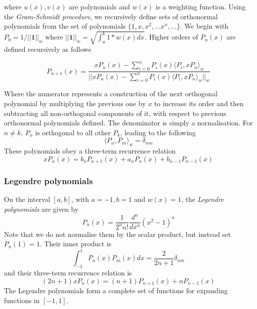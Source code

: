 \documentclass[]{article}
\begin{document}
where $u(x), v(x)$ are polynomials and $w(x)$ is a weighting function.
\newline
\newline
Using the \textit{Gram-Schmidt procedure}, we recursively define sets of orthonormal polynomials from the set of polynomials $\{ 1, x, x^{2},...x^{n},... \}$. We begin with $P_{0}=1/||\textbf{1}||_{w}$ where $||\textbf{1}||_{w} = \sqrt{\int_{a}^{b} 1*w(x) dx}$. Higher orders of $P_{n}(x)$ are defined recursively as follows

\begin{equation} P_{n+1}(x) = \frac{x P_{n}(x)- \sum_{i=0}^{n}P_{i}(x)\langle P_{i}, xP_{n} \rangle_{w}}{||x P_{n}(x)- \sum_{i=0}^{n}P_{i}(x)\langle P_{i}, xP_{n} \rangle_{w}||_{w}} \end{equation}

Where the numerator represents a construction of the next orthogonal polynomial by multiplying the previous one by $x$ to increase its order and then subtracting all non-orthogonal components of it, with respect to previous orthonormal polynomials defined. The denominator is simply a normalisation.
\newline
\newline
For $n \neq k$, $P_{n}$ is orthogonal to all other $P_{k}$, leading to the following 
\begin{equation} \langle P_{n}, P_{m} \rangle_{w} = \delta_{nm} \end{equation}
These polynomials obey a three-term recurrence relation
\begin{equation} xP_{n}(x) = b_{n}P_{n+1}(x) + a_{n}P_{n}(x) + b_{n-1}P_{n-1}(x) \end{equation} 
\subsubsection{Legendre polynomials}
On the interval $[a,b]$, with $a=-1, b=1$ and $w(x)=1$, the \textit{Legendre polynomials} are given by 
\begin{equation} P_{n}(x) = \frac{1}{2^{n}n!}\frac{d^{n}}{dx^{n}}(x^{2}-1)^{n} \end{equation}
Note that we do not normalise them by the scalar product, but instead set $P_{n}(1)=1$.
\newline
\newline
Their inner product is
\begin{equation} \int_{-1}^{1} P_{n}(x)P_{m}(x)dx = \frac{2}{2n+1}\delta_{nm} \end{equation}
and their three-term recurrence relation is
\begin{equation} (2n+1)xP_{n}(x) = (n+1)P_{n+1}(x) + nP_{n-1}(x) \end{equation}
The Legendre polynomials form a complete set of functions for expanding functions in $[-1,1]$.
\end{document}
